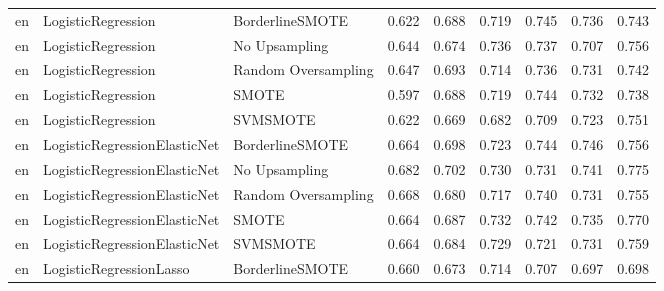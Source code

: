 \begin{tabular}{lllllllll}
      en &           LogisticRegression &     BorderlineSMOTE & 0.622 &                     0.688 &                 0.719 &                  0.745 &                                   0.736 &     0.743 \\
      en &           LogisticRegression &       No Upsampling & 0.644 &                     0.674 &                 0.736 &                  0.737 &                                   0.707 &     0.756 \\
      en &           LogisticRegression & Random Oversampling & 0.647 &                     0.693 &                 0.714 &                  0.736 &                                   0.731 &     0.742 \\
      en &           LogisticRegression &               SMOTE & 0.597 &                     0.688 &                 0.719 &                  0.744 &                                   0.732 &     0.738 \\
      en &           LogisticRegression &            SVMSMOTE & 0.622 &                     0.669 &                 0.682 &                  0.709 &                                   0.723 &     0.751 \\
      en & LogisticRegressionElasticNet &     BorderlineSMOTE & 0.664 &                     0.698 &                 0.723 &                  0.744 &                                   0.746 &     0.756 \\
      en & LogisticRegressionElasticNet &       No Upsampling & 0.682 &                     0.702 &                 0.730 &                  0.731 &                                   0.741 &     0.775 \\
      en & LogisticRegressionElasticNet & Random Oversampling & 0.668 &                     0.680 &                 0.717 &                  0.740 &                                   0.731 &     0.755 \\
      en & LogisticRegressionElasticNet &               SMOTE & 0.664 &                     0.687 &                 0.732 &                  0.742 &                                   0.735 &     0.770 \\
      en & LogisticRegressionElasticNet &            SVMSMOTE & 0.664 &                     0.684 &                 0.729 &                  0.721 &                                   0.731 &     0.759 \\
      en &      LogisticRegressionLasso &     BorderlineSMOTE & 0.660 &                     0.673 &                 0.714 &                  0.707 &                                   0.697 &     0.698 \\

\end{tabular}
